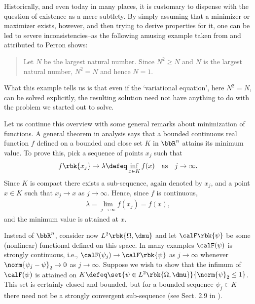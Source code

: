 \documentclass[openany, a4paper, oneside]{jsbook}
\begin{document}
Historically, and even today in many places, it is customary to dispense with the question of existence as a mere subtlety.
By simply assuming that a minimizer or maximizer exists, however, and then trying to derive
properties for it, one can be led to severe inconsistencies--as the following amusing example
taken from \cite{LaurenceYoung1} and attributed to Perron shows:
\begin{quote}
Let $N$ be the largest natural number.
Since $N^2 \geq N$ and $N$ is the largest natural number, $N^2 = N$ and hence $N=1$.
\end{quote}
What this example tells us is that even if the `variational equation', here $N^2 = N$, can be solved explicitly,
the resulting solution need not have anything to do with the problem we started out to solve.

Let us continue this overview with some general remarks about minimization of functions.
A general theorem in analysis says that a bounded continuous real function $f$ defined on a bounded and close set $K$
in $\bbR^n$ attains its minimum value.
To prove this, pick a sequence of points $x_j$ such that
\begin{align}
 f \rbk{x_j} \to \lambda
 \defeq
 \inf_{x \in K} f (x) \quad \text{as} \quad j \to \infty.
\end{align}
Since $K$ is compact there exists a sub-sequence, again denoted by $x_j$, and a point $x \in K$ such that $x_j \to x$ as $j \to \infty$.
Hence, since $f$ is continuous,
\begin{align}
 \lambda
 =
 \lim_{j \to \infty} f (x_j) = f (x),
\end{align}
and the minimum value is attained at $x$.

Instead of $\bbR^n$, consider now $L^2 \rbk{\Omega, \dmu}$ and let $\calF \rbk{\psi}$ be some (nonlinear) functional
defined on this space.
In many examples $\calF (\psi)$ is strongly continuous, i.e., $\calF (\psi_j) \to \calF \rbk{\psi}$ as $j \to \infty$
whenever $\norm{\psi_j - \psi}_2 \to 0$ as $j \to \infty$.
Suppose we wish to show that the infimum of $\calF (\psi)$ is attained on $K \defeq \set{\psi \in L^2 \rbk{\Omega, \dmu}}{\norm{\psi}_2 \leq 1}$.
This set is certainly closed and bounded, but for a bounded sequence $\psi_j \in K$
there need not be a strongly convergent sub-sequence (see Sect. 2.9 in \cite{LiebLoss1}).
\end{document}

